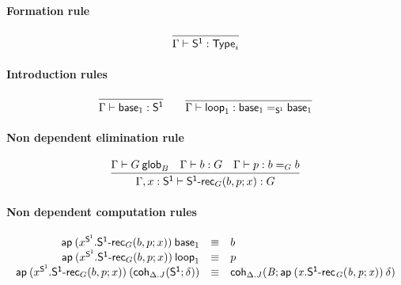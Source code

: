 \paragraph{Formation rule}

\begin{small}
  \[
  \infer{\wftype\Gamma{\dsd{S^1}}}{}
  \]
\end{small}

\paragraph{Introduction rules}

\begin{small}
  \[
  \infer{\ofglob{\Gamma}{\base{1}}{\dsd{S^1}}}{} \qquad
  \infer{\ofglob{\Gamma}{\lp{1}}{\homj{\dsd{S^1}}{\base{1}}{\base{1}}}}{}
  \]
\end{small}

\paragraph{Non dependent elimination rule}

\begin{small}
  \[
  \infer{\ofglob{\Gamma,x:\dsd{S^1}}{\dsd{S^1\text{-}rec}_G(b, p; x)}{G}}
  {\wfglob{\Gamma}{G}{m}{B} & \ofglob{\Gamma}{b}{G} &
    \ofglob{\Gamma}{p}{\homj{G}{b}{b}}}
  \]
\end{small}


\paragraph{Non dependent computation rules}

\begin{small}
  \[
  \begin{array}{rcl}
    \mathsf{ap} \: {(x^{\mathsf{S^1}}.\mathsf{S^1\text{-}rec}_G(b, p; x))} \: {\mathsf{base}_{1}} &
    \equiv & b \\
    \mathsf{ap} \: {(x^{\mathsf{S^1}}.\mathsf{S^1\text{-}rec}_G(b, p; x))} \: {\mathsf{loop}_{1}} & \equiv & p\\
    \mathsf{ap} \: {(x^{\mathsf{S^1}}.\mathsf{S^1\text{-}rec}_G(b, p; x))} \: {(\mathsf{coh}_{\Delta.J} \mathit{(\mathsf{S^1};\delta)})} & \equiv &
    \mathsf{coh}_{\Delta.J} \mathit{(B;\mathsf{ap} \: {(x.\mathsf{S^1\text{-}rec}_G(b, p; x))} \: {\delta})}
    \\
  \end{array}
  \]
\end{small}

